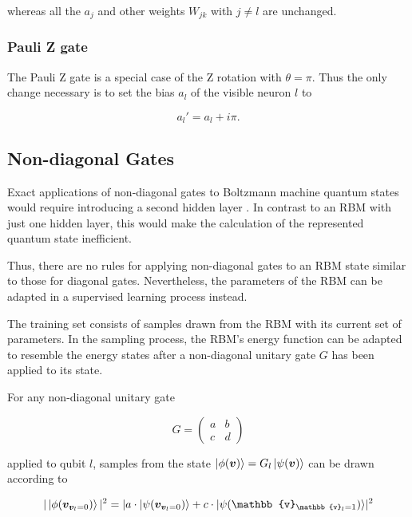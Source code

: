 whereas all the $a_{j}$ and other weights $W_{jk}$ with $j \neq l$ are unchanged.

\subsubsection{Pauli Z gate}
The Pauli Z gate is a special case of the Z rotation with $\theta = \pi$. Thus the 
only change necessary is to set the bias $a_l$ of the visible neuron $l$ to

\begin{equation}
    a_{l}\prime = a_{l} + i \pi.
\end{equation}

\subsection{Non-diagonal Gates}

Exact applications of non-diagonal gates to Boltzmann machine quantum states would require introducing a second hidden layer \cite{carleo2018constructing}. In contrast to an RBM with just one hidden layer, this would make the calculation of the represented quantum state inefficient.

Thus, there are no rules for applying non-diagonal gates to an RBM state similar to those for diagonal gates. Nevertheless, the parameters of the RBM can be adapted in a 
supervised learning process instead.

The training set consists of samples drawn from the RBM with its current set of parameters. In the sampling process, the RBM's energy function can be adapted to resemble the energy states after a non-diagonal unitary gate $ G $ has been applied to its state.

For any non-diagonal unitary gate

\begin{equation}
    G =  \begin{pmatrix}
        a & b \\
        c & d
    \end{pmatrix}
\end{equation}

applied to qubit $l$, samples from the state $\ket{\phi(\bm{v})} = G_l\ket{\psi(\bm{v})}$ can be drawn according to 

\begin{equation}
    \label{eq:prob1}
    | \ket{\phi(\bm{v}_{\bm{v}_l = 0})} |^2 = 
    \lvert  a \cdot \ket{\psi(\bm{v}_{\bm{v}_l = 0})} +
            c \cdot \ket{\psi(\mathbb{v}_{\mathbb{v}_l = 1})}
    \rvert^2
\end{equation}

